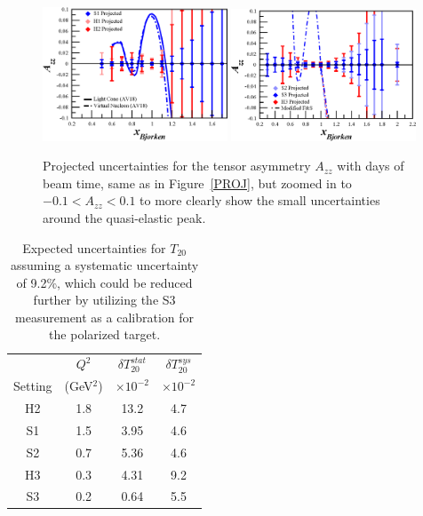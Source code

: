 \begin{figure}
\begin{center}
\includegraphics[width=0.49\textwidth]{figs/Azz_S1_H1_H2_zoom.eps} 
\includegraphics[width=0.49\textwidth]{figs/Azz_S2_H3_S3_zoom.eps} 
\caption{\label{PROJ-zoom}Projected uncertainties for the tensor asymmetry $A_{zz}$ with \productiondays days of beam time, same as in Figure~\ref{PROJ}, but zoomed in to $-0.1<A_{zz}<0.1$ to more clearly show the small uncertainties around the quasi-elastic peak.
}
\end{center}
\end{figure}

\begin{table}
\begin{center}
\begin{tabular}{c|c|c|c}
		& $Q^2$    	& $\delta T_{20}^{stat}$	&  $\delta T_{20}^{sys}$ \\
Setting	& (GeV$^2$)	& $\times 10^{-2}$		& $\times 10^{-2}$ \\
\hline\hline
H2 		& 1.8		&  13.2					& 4.7 \\  
S1 		& 1.5		&  3.95					& 4.6 \\
S2 		& 0.7		&  5.36					& 4.6 \\  
H3 		& 0.3		&  4.31					& 9.2 \\  
S3 		& 0.2		&  0.64					& 5.5 \\
  
\hline\hline
\end{tabular}
\caption{\label{RATES-T20}Expected uncertainties for $T_{20}$ assuming a systematic uncertainty of 9.2\%, which could be reduced further by utilizing the S3 measurement as a calibration for the polarized target.}
\end{center}
\end{table}

